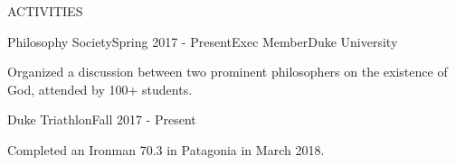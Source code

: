 \documentclass{resume} %
\begin{document}


\begin{rSection}{ACTIVITIES}


\begin{rSubsection}{Philosophy Society}{Spring 2017 - Present}{Exec Member}{Duke University}
\item Organized a discussion between two prominent  philosophers on the existence of God, attended by 100+ students.
\end{rSubsection}




\begin{rSubsection}{Duke Triathlon}{Fall 2017 - Present}{}{}
\item Completed an Ironman 70.3 in Patagonia in March 2018.
\end{rSubsection}



\end{rSection}
\end{document}
